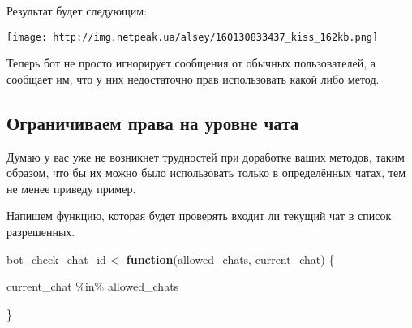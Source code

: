 \documentclass[
]{book}
\newenvironment{Shaded}{\begin{snugshade}}{\end{snugshade}}
\newcommand{\CommentTok}[1]{\textcolor[rgb]{0.56,0.35,0.01}{\textit{#1}}}
\newcommand{\ControlFlowTok}[1]{\textcolor[rgb]{0.13,0.29,0.53}{\textbf{#1}}}
\newcommand{\FunctionTok}[1]{\textcolor[rgb]{0.00,0.00,0.00}{#1}}
\newcommand{\NormalTok}[1]{#1}
\newcommand{\OtherTok}[1]{\textcolor[rgb]{0.56,0.35,0.01}{#1}}
\newcommand{\SpecialCharTok}[1]{\textcolor[rgb]{0.00,0.00,0.00}{#1}}
\newcommand{\StringTok}[1]{\textcolor[rgb]{0.31,0.60,0.02}{#1}}
\begin{document}
\begin{Shaded}
\end{Shaded}

Результат будет следующим:

\texttt{[image: http://img.netpeak.ua/alsey/160130833437\_kiss\_162kb.png]}

Теперь бот не просто игнорирует сообщения от обычных пользователей, а сообщает им, что у них недостаточно прав использовать какой либо метод.

\hypertarget{ux43eux433ux440ux430ux43dux438ux447ux438ux432ux430ux435ux43c-ux43fux440ux430ux432ux430-ux43dux430-ux443ux440ux43eux432ux43dux435-ux447ux430ux442ux430-1}{%
\subsection{Ограничиваем права на уровне чата}\label{ux43eux433ux440ux430ux43dux438ux447ux438ux432ux430ux435ux43c-ux43fux440ux430ux432ux430-ux43dux430-ux443ux440ux43eux432ux43dux435-ux447ux430ux442ux430-1}}

Думаю у вас уже не возникнет трудностей при доработке ваших методов, таким образом, что бы их можно было использовать только в определённых чатах, тем не менее приведу пример.

Напишем функцию, которая будет проверять входит ли текущий чат в список разрешенных.

\begin{Shaded}
\begin{Highlighting}[]
\NormalTok{bot\_check\_chat\_id }\OtherTok{\textless{}{-}} 
  \ControlFlowTok{function}\NormalTok{(allowed\_chats, current\_chat) \{}

\NormalTok{     current\_chat }\SpecialCharTok{\%in\%}\NormalTok{ allowed\_chats }
    
\NormalTok{\}}
\end{Highlighting}
\end{Shaded}
\end{document}
